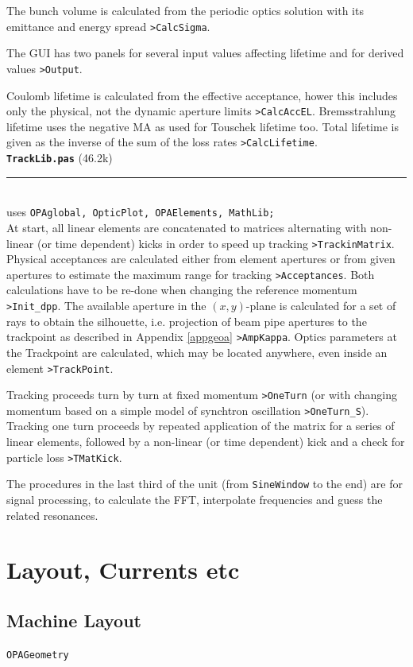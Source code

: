 \documentclass[12pt]{article}
\newcommand\code[1]{{\tt #1}}
\newcommand{\opagui}[1]{\colorbox{blue!20}{\code{#1}}}
\newcommand{\oguih}[2]{\subsection{\label{#2}#1}{\Huge\opagui{#2}}\\}
\newcommand\opamodule[3]{{\bf \tt #1} #2\\  \rule[3pt]{\textwidth}{0.2pt} \\ {\scriptsize uses \tt  #3}\\[1ex]}
\begin{document}
The bunch volume is calculated from the periodic optics solution with its emittance and energy spread \code{>CalcSigma}.

The GUI has two panels for several input values affecting lifetime and for derived values \code{>Output}.

Coulomb lifetime is calculated from the effective acceptance, hower this includes only the physical, not the dynamic aperture limits \code{>CalcAccEL}. Bremsstrahlung lifetime uses the negative MA as used for Touschek lifetime too. Total lifetime is given as the inverse of the sum of the loss rates \code{>CalcLifetime}.\\

\opamodule{TrackLib.pas}{(46.2k)}{OPAglobal, OpticPlot, OPAElements, MathLib;}
At start, all linear elements are concatenated to matrices alternating with non-linear (or time dependent) kicks in order to speed up tracking \code{>TrackinMatrix}. Physical acceptances are calculated either from element apertures or from given apertures to estimate the maximum range for tracking \code{>Acceptances}. Both calculations have to be re-done when changing the reference momentum \code{>Init\_dpp}.
The available aperture in the $(x,y)$-plane is calculated for a set of rays to obtain the silhouette, i.e. projection of beam pipe apertures to the trackpoint as described in Appendix \ref{appgeoa} \code{>AmpKappa}. Optics parameters at the Trackpoint are calculated, which may be located anywhere, even inside an element \code{>TrackPoint}.

Tracking proceeds turn by turn at fixed momentum \code{>OneTurn} (or with changing momentum based on a simple model of synchtron oscillation \code{>OneTurn\_S}). Tracking one turn proceeds by repeated application of the matrix for a series of linear elements, followed by a non-linear (or time dependent) kick and a check for particle loss \code{>TMatKick}.

The procedures in the last third of the unit (from {\tt SineWindow} to the end) are for signal processing, to calculate the FFT, interpolate frequencies and guess the related resonances.\\




\section{\label{secelse}Layout, Currents etc}

\oguih{Machine Layout}{OPAGeometry}
\end{document}
